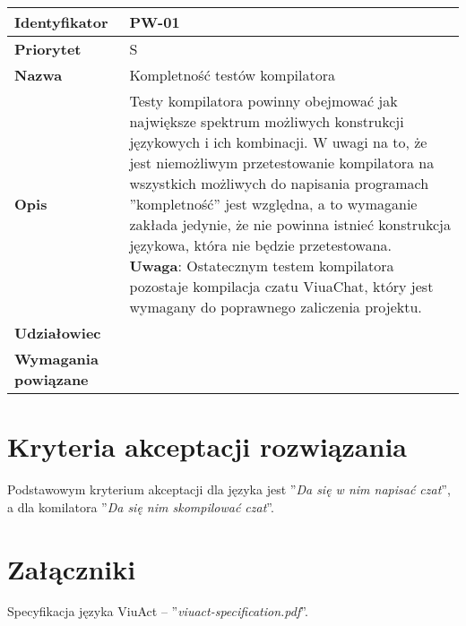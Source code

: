 \begin{tabular}{ | l | l | }
    \hline
    \textbf{Identyfikator} & \parbox[t]{11cm}{PW-01} \\
    \hline
    \textbf{Priorytet} & S \\
    \hline
    \textbf{Nazwa} & Kompletność testów kompilatora \\
    \hline
    \textbf{Opis} & \parbox[t]{11cm}{
        Testy kompilatora powinny obejmować jak największe spektrum możliwych konstrukcji językowych i
        ich kombinacji. W uwagi na to, że jest niemożliwym przetestowanie kompilatora na wszystkich
        możliwych do napisania programach ''kompletność'' jest względna, a to wymaganie zakłada jedynie, że
        nie powinna istnieć konstrukcja językowa, która nie będzie przetestowana. \\
        \textbf{Uwaga}: Ostatecznym testem kompilatora pozostaje kompilacja czatu ViuaChat, który jest
        wymagany do poprawnego zaliczenia projektu.
    } \\
    \hline
    \textbf{Udziałowiec} & \phantom{} \\
    \hline
    \textbf{Wymagania powiązane} & \phantom{} \\
    \hline
\end{tabular}

\section{Kryteria akceptacji rozwiązania}

Podstawowym kryterium akceptacji dla języka jest ''\emph{Da się w nim napisać czat}'', a
dla komilatora ''\emph{Da się nim skompilować czat}''.


\section{Załączniki}

Specyfikacja języka ViuAct -- ''\emph{viuact-specification.pdf}''.
